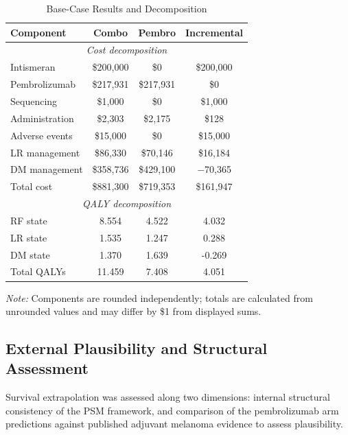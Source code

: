 \documentclass[12pt,a4paper]{article}
\begin{document}
\begin{table}[H]
\centering
\caption{Base-Case Results and Decomposition}
\label{tab:base}
\begin{tabular}{lccc}
\toprule
\textbf{Component} & \textbf{Combo} & \textbf{Pembro} & \textbf{Incremental} \\
\midrule
\multicolumn{4}{c}{\textit{Cost decomposition}} \\
Intismeran & \$200,000 & \$0 & \$200,000 \\
Pembrolizumab & \$217,931 & \$217,931 & \$0 \\
Sequencing & \$1,000 & \$0 & \$1,000 \\
Administration & \$2,303 & \$2,175 & \$128 \\
Adverse events & \$15,000 & \$0 & \$15,000 \\
LR management & \$86,330 & \$70,146 & \$16,184 \\
DM management & \$358,736 & \$429,100 & $-$70,365 \\
\midrule
Total cost & \$881,300 & \$719,353 & \$161,947 \\
\midrule
\multicolumn{4}{c}{\textit{QALY decomposition}} \\
RF state & 8.554 & 4.522 & 4.032 \\
LR state & 1.535 & 1.247 & 0.288 \\
DM state & 1.370 & 1.639 & -0.269 \\
\midrule
Total QALYs & 11.459 & 7.408 & 4.051 \\
\bottomrule
\end{tabular}
\vspace{4pt}
\begin{minipage}[t]{\linewidth}
\footnotesize
\textit{Note:} Components are rounded independently; totals are calculated from unrounded values and may differ by \$1 from displayed sums.
\end{minipage}
\end{table}

\subsection{External Plausibility and Structural Assessment}

Survival extrapolation was assessed along two dimensions: internal structural consistency of the PSM framework, and comparison of the \mbox{pembrolizumab} arm predictions against published adjuvant melanoma evidence to assess plausibility.
\end{document}
